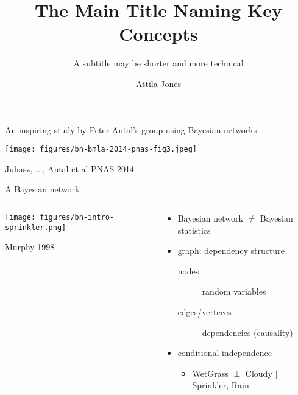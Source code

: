 \documentclass[aspectratio=169]{beamer}
\title{The Main Title Naming Key Concepts}
\subtitle{A subtitle may be shorter and more technical}
\author{Attila Jones}
\date{}
\begin{document}
\begin{frame}{An inspiring study by Peter Antal's group using Bayesian
  networks}
\begin{center}
\texttt{[image: figures/bn-bmla-2014-pnas-fig3.jpeg]}
\end{center}

\begin{center}
\tiny{Juhasz, ..., Antal et al PNAS 2014}
\end{center}
\end{frame}


\begin{frame}{A Bayesian network}
\begin{columns}[t]
\begin{column}{0.6\textwidth}

\texttt{[image: figures/bn-intro-sprinkler.png]}

\begin{center}
\tiny{Murphy 1998}
\end{center}
\end{column}

\begin{column}{0.4\textwidth}
\begin{itemize}
  \item Bayesian network \(\neq\) Bayesian statistics
  \item graph: dependency structure
  \begin{description}
    \item[nodes] random variables
    \item[edges/verteces] dependencies (causality)
  \end{description}
  \item conditional independence
  \begin{itemize}
    \item WetGrass \(\perp\) Cloudy \(|\) Sprinkler, Rain
  \end{itemize}
\end{itemize}

\end{column}
\end{columns}
\end{frame}
\end{document}

